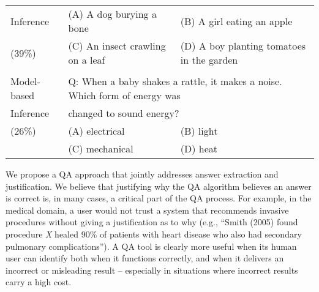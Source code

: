 \begin{table*}[t]
\begin{center}
\begin{tabularx}{\textwidth}{p{2cm}p{5cm}p{5.9cm}}
Inference	&   (A) A dog burying a bone			&   (B) A girl eating an apple	\\
(39\%)		&	(C) An insect crawling on a leaf	&  (D) A boy planting tomatoes in the garden  \\
\\
Model-based & 	\multicolumn{2}{l}{Q: When a baby shakes a rattle, it makes a noise. Which form of energy was} \\
Inference	& 	\multicolumn{2}{l}{changed to sound energy?} \\
(26\%)		&	(A) electrical	&   (B) light   \\
			&	(C) mechanical	&   (D) heat  \\
			
\end{tabularx}


\label{tab:inferenceexamples}
\end{center}
\end{table*}





We propose a QA approach that jointly addresses answer extraction and justification.
We believe that justifying why the QA algorithm believes an answer is correct is, in many cases, a critical part of the QA process.
For example, in the medical domain, a user would not trust a system that recommends invasive procedures without giving a justification as to why (e.g., ``Smith (2005) found procedure \emph{X} healed 90\% of patients with heart disease who also had secondary pulmonary complications'').  A QA tool is clearly more useful when its human user can identify both when it functions correctly, and when it delivers an incorrect or misleading result -- especially in situations where incorrect results carry a high cost.  


